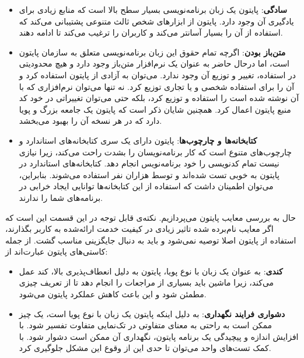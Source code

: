 \begin{itemize}

\item \textbf{سادگی}: پایتون یک زبان برنامه‌نویسی بسیار سطح بالا است که منابع زیادی برای یادگیری آن وجود دارد. پایتون از ابزارهای شخص ثالث متنوعی پشتیبانی می‌کند که استفاده از آن را بسیار آسانتر می‌کند و کاربران را ترغیب می‌کند تا ادامه دهند\cite{srinath2017python, sharma2020python}.

\item \textbf{متن‌باز بودن}: اگرچه تمام حقوق این زبان برنامه‌نویسی متعلق به سازمان پایتون است، اما درحال‌ حاضر به عنوان یک نرم‌افزار متن‌باز وجود دارد و هیچ محدودیتی در استفاده، تغییر و توزیع آن وجود ندارد. می‌توان به آزادی از پایتون استفاده کرد و آن را برای استفاده شخصی و یا تجاری توزیع کرد. نه تنها می‌توان نرم‌افزاری که با آن نوشته شده است را استفاده و توزیع کرد، بلکه حتی می‌توان تغییراتی در خود کد منبع پایتون اعمال کرد. همچنین شایان ذکر است که پایتون یک جامعه بزرگ و پویا دارد که در هر نسخه آن را بهبود می‌بخشد\cite{srinath2017python, sharma2020python}.

\item \textbf{کتابخانه‌ها و چارچوب‌ها}: پایتون دارای یک سری کتابخانه‌های استاندارد و چارچوب‌های متنوع است که کار برنامه‌نویسان را بشدت راحت می‌کند، زیرا نیازی نیست تمام کدنویسی را خود برنامه‌نویس انجام دهد. کتابخانه‌های استاندارد در پایتون به خوبی تست شده‌اند و توسط هزاران نفر استفاده می‌شوند. بنابراین، می‌توان اطمینان داشت که استفاده از این کتابخانه‌ها توانایی ایجاد خرابی در برنامه‌های شما را ندارند\cite{srinath2017python, sharma2020python}.

\end{itemize}

حال به بررسی معایب پایتون می‌پردازیم. نکته‌ی قابل توجه در این قسمت این است که اگر معایب نام‌برده شده تاثیر زیادی در کیفیت خدمت ارائه‌شده به کاربر بگذارند، استفاده از پایتون اصلا توصیه نمی‌شود و باید به دنبال جایگزینی مناسب گشت. از جمله کاستی‌های پایتون عبارت‌اند از:

\begin{itemize}

\item \textbf{کندی}: به عنوان یک زبان با نوع پویا، پایتون به دلیل انعطاف‌پذیری بالا، کند عمل می‌کند، زیرا ماشین باید بسیاری از مراجعات را انجام دهد تا از تعریف چیزی مطمئن شود و این باعث کاهش عملکرد پایتون می‌شود\cite{srinath2017python, sharma2020python}.

\item \textbf{دشواری فرایند نگهداری}: به دلیل اینکه پایتون یک زبان با نوع پویا است، یک چیز ممکن است به راحتی به معنای متفاوتی در تک‌نمایی متفاوت تفسیر شود. با افزایش اندازه و پیچیدگی یک برنامه پایتون، نگهداری آن ممکن است دشوار شود. با کمک تست‌های واحد می‌توان تا حدی این از وقوع این مشکل جلوگیری کرد\cite{srinath2017python, sharma2020python}.

\end{itemize}

